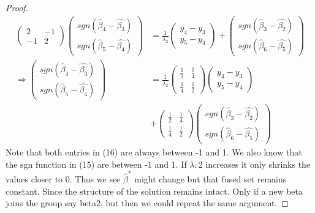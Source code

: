 \documentclass{article}
\theoremstyle{definition}
\DeclareMathOperator*{\sgn}{sgn}
\begin{document}
\begin{proof}
\begin{align}
\left(\begin{matrix}2&-1\\-1&2\end{matrix}\right)\left(\begin{matrix}sgn(\hat{\beta}_4-\hat{\beta_3})\\sgn(\hat{\beta}_5-\hat{\beta_4})\end{matrix}\right)&=\frac{1}{\lambda_2} \left(\begin{matrix}y_4-y_3\\y_5-y_4\end{matrix}\right) + \left(\begin{matrix}sgn(\hat{\beta}_3-\hat{\beta_2})\\sgn(\hat{\beta}_6-\hat{\beta_5})\end{matrix}\right) \\ \Rightarrow \left(\begin{matrix}sgn(\hat{\beta}_4-\hat{\beta_3})\\sgn(\hat{\beta}_5-\hat{\beta_4})\end{matrix}\right)&=\frac{1}{\lambda_2} \left(\begin{matrix}\frac{1}{2}&\frac{1}{4}\\\frac{1}{4}&\frac{1}{2}\end{matrix}\right)   \left(\begin{matrix}y_4-y_3\\y_5-y_4\end{matrix}\right) \\ &+  \left(\begin{matrix}\frac{1}{2}&\frac{1}{4}\\\frac{1}{4}&\frac{1}{2}\end{matrix}\right)      
  \left(\begin{matrix}sgn(\hat{\beta}_3-\hat{\beta_2})\\sgn(\hat{\beta}_6-\hat{\beta_5})\end{matrix}\right)
\end{align}
Note that both entries in (16) are always between -1 and 1. We also know that the sgn function in (15) are between -1 and 1. If $\lambda:2$ increases it only shrinks the values closer to 0. Thus we see $\hat{\beta}^*$ might change but that fused set remains constant. Since the structure of the solution remains intact. Only if a new beta joins the group say beta2, but then we could repeat the same argument.
\end{proof}

\newpage

\end{document}
